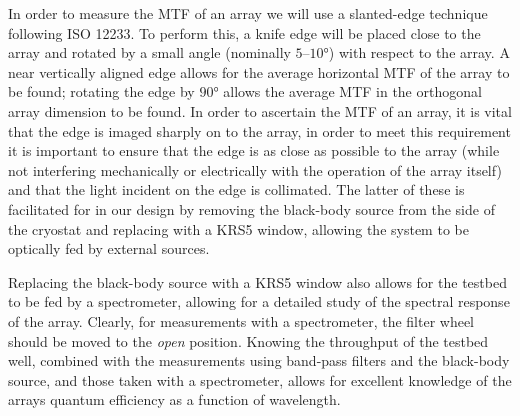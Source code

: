 \documentclass{spie}
\begin{document}
\par 
In order to measure the MTF of an array we will use a slanted-edge technique following ISO 12233\cite{ISO12233}. To perform this, a knife edge will be placed close to the array and rotated by a small angle (nominally $5\mbox{--}10\si{\degree}$) with respect to the array. A near vertically aligned edge allows for the average horizontal MTF of the array to be found; rotating the edge by $90\si{\degree}$ allows the average MTF in the orthogonal array dimension to be found. In order to ascertain the MTF of an array, it is vital that the edge is imaged sharply on to the array, in order to meet this requirement it is important to ensure that the edge is as close as possible to the array (while not interfering mechanically or electrically with the operation of the array itself) and that the light incident on the edge is collimated. The latter of these is facilitated for in our design by removing the black-body source from the side of the cryostat and replacing with a KRS5 window, allowing the system to be optically fed by external sources.
\par 
Replacing the black-body source with a KRS5 window also allows for the testbed to be fed by a spectrometer, allowing for a detailed study of the spectral response of the array. Clearly, for measurements with a spectrometer, the filter wheel should be moved to the \textit{open} position. Knowing the throughput of the testbed well, combined with the measurements using band-pass filters and the black-body source, and those taken with a spectrometer, allows for excellent knowledge of the arrays quantum efficiency as a function of wavelength.
%
\end{document}
